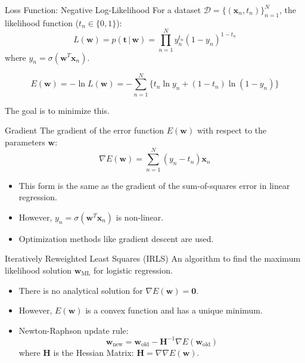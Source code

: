 \documentclass{beamer} %
\newcommand{\mat}[1]{\mathbf{#1}}
\newcommand{\vect}[1]{\mathbf{#1}}
\newcommand{\given}{\,|\,}
\begin{document}
\begin{frame}{Loss Function: Negative Log-Likelihood}
  For a dataset $\mathcal{D} = \{(\vect{x}_n, t_n)\}_{n=1}^N$, the likelihood function ($t_n \in \{0,1\}$):
  \begin{equation*}
    L(\vect{w}) = p(\vect{t} \given \vect{w}) = \prod_{n=1}^{N} y_n^{t_n} (1 - y_n)^{1 - t_n}
  \end{equation*}
  where $y_n = \sigma(\vect{w}^T \vect{x}_n)$.

  \vspace{1em}
  \begin{dfn}
  \begin{equation*}
    E(\vect{w}) = -\ln L(\vect{w}) = -\sum_{n=1}^{N} \{ t_n \ln y_n + (1 - t_n) \ln(1 - y_n) \}
  \end{equation*}
  \end{dfn}
  The goal is to minimize this.
\end{frame}

\begin{frame}{Gradient}
  The gradient of the error function $E(\vect{w})$ with respect to the parameters $\vect{w}$:
  \begin{equation*}
    \nabla E(\vect{w}) = \sum_{n=1}^{N} (y_n - t_n) \vect{x}_n
  \end{equation*}
  \begin{itemize}
    \item This form is the same as the gradient of the sum-of-squares error in linear regression.
    \item However, $y_n = \sigma(\vect{w}^T \vect{x}_n)$ is non-linear.
    \item Optimization methods like gradient descent are used.
  \end{itemize}
\end{frame}

\begin{frame}{Iteratively Reweighted Least Squares (IRLS)}
  An algorithm to find the maximum likelihood solution $\vect{w}_{\text{ML}}$ for logistic regression.
  \begin{itemize}
    \item There is no analytical solution for $\nabla E(\vect{w}) = \mathbf{0}$.
    \item However, $E(\vect{w})$ is a convex function and has a unique minimum.
    \item Newton-Raphson update rule:
      \begin{equation*}
        \vect{w}_{\text{new}} = \vect{w}_{\text{old}} - \mat{H}^{-1} \nabla E(\vect{w}_{\text{old}})
      \end{equation*}
      where $\mat{H}$ is the Hessian Matrix: $\mat{H} = \nabla \nabla E(\vect{w})$.
  \end{itemize}
\end{frame}
\end{document}
